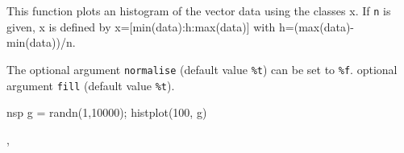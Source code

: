 \begin{mandescription}
  This function plots an histogram of the vector data using the
  classes x. If \verb+n+ is given, x is defined by x=[min(data):h:max(data)] with
  h=(max(data)-min(data))/n.

  The optional argument \verb+normalise+ (default value \verb+%t+) can be set to
  \verb+%f+.
  optional argument \verb+fill+ (default value \verb+%t+).


  
\end{mandescription}

\begin{examples}
\begin{mintednsp}{nsp}
g = randn(1,10000);
histplot(100, g)
\end{mintednsp}

\end{examples}

\begin{manseealso}
  , 
\end{manseealso}

